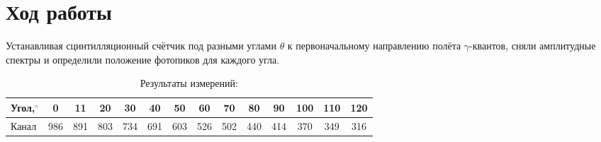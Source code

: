 \documentclass[letterpaper,12pt]{article}
\begin{document}
	\section{Ход работы}
	Устанавливая сцинтилляционный счётчик под разными углами $\theta$ к первоначальному направлению полёта $\gamma$-квантов, сняли амплитудные спектры и определили положение фотопиков для каждого угла.
	
		
			\begin{table}[H]
				\caption{Результаты измерений:}
				\hspace{0.7cm}
				\begin{tabular}{|l||c|c|c|c|c|c|c|c|c|c|c|c|c|}
					\hline
					Угол,$^\circ$ & 0 & 11 & 20 & 30 & 40 & 50 & 60 & 70 & 80 & 90 & 100 & 110 & 120 \\ \hline
					Канал & 986 & 891 & 803 & 734 & 691 & 603 & 526 & 502 & 440 & 414 & 370 & 349 & 316 \\ \hline
					
				\end{tabular}
			\end{table}
			
\end{document}
